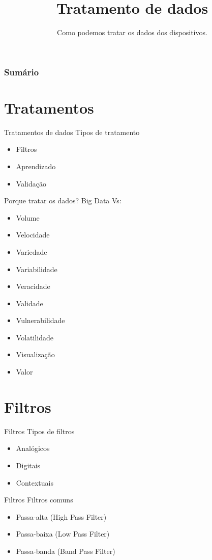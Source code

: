 \documentclass[t]{beamer}
\title{Tratamento de dados}
\subtitle{Como podemos tratar os dados dos dispositivos.}
\begin{document}
\frame{\titlepage}

\begin{frame}
\frametitle{Sumário}
\tableofcontents
\end{frame}

\section{Tratamentos}

\begin{frame}{Tratamentos de dados}
Tipos de tratamento
\begin{itemize}
	\item Filtros
	\item Aprendizado
	\item Validação
\end{itemize}
\end{frame}

\begin{frame}{Porque tratar os dados?}
Big Data Vs:
\begin{itemize}
	\item Volume
	\item Velocidade
	\item Variedade
	\item Variabilidade
	\item Veracidade
	\item Validade
	\item Vulnerabilidade
	\item Volatilidade
	\item Visualização
	\item Valor
\end{itemize}
\end{frame}

\section{Filtros}
\begin{frame}{Filtros}
Tipos de filtros
\begin{itemize}
	\item Analógicos
	\item Digitais
	\item Contextuais
\end{itemize}
\end{frame}

\begin{frame}{Filtros}
Filtros comuns
\begin{itemize}
	\item Passa-alta (High Pass Filter)
	\item Passa-baixa (Low Pass Filter)
	\item Passa-banda (Band Pass Filter)
\end{itemize}
\end{frame}
\end{document}
